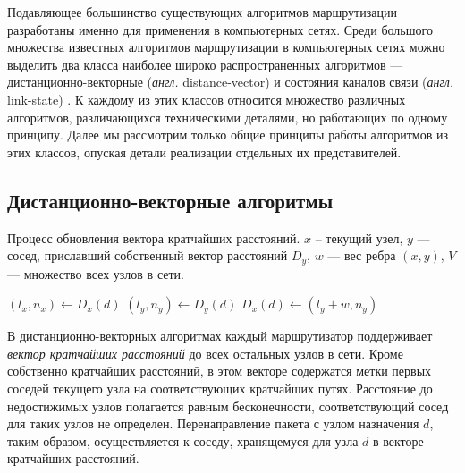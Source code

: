 \documentclass[specification,annotation,times]{itmo-student-thesis}
\theoremstyle{definition}
\begin{document}
Подавляющее большинство существующих алгоритмов маршрутизации разработаны именно
для применения в компьютерных сетях. Среди большого множества известных
алгоритмов маршрутизации в компьютерных сетях можно выделить два класса
наиболее широко распространенных алгоритмов --- дистанционно-векторные
(\textit{англ.} distance-vector) \cite{arpanet-orig} и состояния каналов связи
(\textit{англ.} link-state)
\cite{link-state-arpanet}. К каждому из этих классов относится множество различных
алгоритмов, различающихся техническими деталями, но работающих по одному
принципу. Далее мы рассмотрим только общие принципы работы алгоритмов из этих
классов, опуская детали реализации отдельных их представителей.

\subsection{Дистанционно-векторные алгоритмы}\label{overview:networks:dv}


\begin{algorithm}[!h]
\caption{Процесс обновления вектора кратчайших расстояний. $x$ -- текущий узел,
$y$ --- сосед, приславший собственный вектор расстояний $D_y$, $w$ --- вес ребра
  $(x, y)$, $V$ --- множество всех узлов в сети.}
\label{dv-pseudocode}
\begin{algorithmic}[1]
      \State $(l_x, n_x) \gets D_x(d)$
      \State $(l_y, n_y) \gets D_y(d)$
				\State $D_x(d) \gets (l_y + w, n_y)$
			\EndIf
		\EndFor
	\EndProcedure
\end{algorithmic}
\end{algorithm}

В дистанционно-векторных алгоритмах каждый маршрутизатор поддерживает
\textit{вектор кратчайших расстояний} до всех остальных узлов в сети. Кроме
собственно кратчайших расстояний, в этом векторе содержатся метки первых соседей
текущего узла на соответствующих кратчайших путях. Расстояние до недостижимых
узлов полагается равным бесконечности, соответствующий сосед для таких узлов не
определен. Перенаправление пакета с узлом назначения $d$, таким образом,
осуществляется к соседу, хранящемуся для узла $d$ в векторе кратчайших
расстояний.
\end{document}
